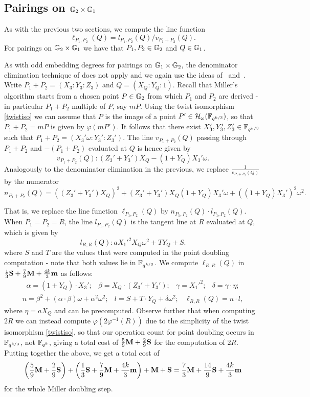 \subsection{Pairings on $\mathbb{G}_{2} \times \mathbb{G}_{1}$}

As with the previous two sections, we compute the line function 
$$\ell_{P_1,P_2}(Q) = l_{P_1,P_2}(Q)/v_{P_1 + P_2}(Q).$$
For pairings on $\mathbb{G}_{2} \times \mathbb{G}_{1}$ we have that $P_1, P_2 \in \mathbb{G}_{2}$ and $Q \in \mathbb{G}_{1}$.

As with odd embedding degrees for pairings on $\mathbb{G}_{1} \times \mathbb{G}_{2}$, 
the denominator elimination technique of \cite{2010/Gu} does not apply
 and we again use the ideas of~\cite{2008/lin} and~\cite{2009/deg15}.
Write $P_1 + P_2 = (X_3:Y_3:Z_3)$ and $Q = (X_Q:Y_Q:1)$. 
Recall that Miller's algorithm starts from a chosen point $P \in \mathbb{G}_{2}$
from which $P_1$ and $P_2$ are derived - in particular $P_1 + P_2$
multiple of $P$, say $mP$.
Using the twist isomorphism \eqref{twistiso} we can assume that
$P$ is the image of a point $P' \in \mathcal{H}_{\omega}(\mathbb{F}_{q^{k/3}})$,
so that $P_1 + P_2 = mP$ is given by $\varphi(mP')$.
It follows that there exist $X_3', Y_3',Z_3' \in \mathbb{F}_{q^{k/3}}$ such that
$P_1 + P_2 = (X_3'\omega : Y_3':Z_3')$. 
The line $v_{P_1+P_2}(Q)$ passing through $P_1+P_2$ and $-(P_1 + P_2)$ 
evaluated at $Q$
is hence given by
\[v_{P_1+P_2}(Q): 
(Z_3' + Y_3')X_Q - (1+Y_Q)X_3'\omega.\]
Analogously to the denominator elimination in the previous, we
replace $\frac{1}{v_{P_1+P_2}(Q)}$ by the numerator 
$$n_{P_1+P_2}(Q) = ((Z_3' + Y_3')X_Q)^2 
+ (Z_3' + Y_3')X_Q(1+Y_Q)X_3'\omega 
+ ((1+Y_Q)X_3')^2\omega^2.$$

That is, we replace the line function $\ell_{P_1,P_2}(Q)$ by $n_{P_1,P_2}(Q) \cdot l_{P_1,P_2}(Q)$.
When $P_1 = P_2 = R$, the line $l_{P_1,P_2}(Q)$ is the tangent line at $R$ evaluated at $Q$, which is given by
\[l_{R,R}(Q): aX_1'^2 X_Q \omega^2 + T Y_Q + S.\]
where $S$ and $T$ are the values that were computed in the point doubling computation - note that
both values lie in $\mathbb{F}_{q^{k/3}}$.
We compute $\ell_{R,R}(Q)$ in 
$\frac{1}{3}\textbf{S} + \frac{7}{9}\textbf{M} + \frac{4k}{3}\textbf{m} $ as follows:
\[\begin{array}{cccc}
\alpha = (1+Y_Q)\cdot X_3';&
 \beta = X_Q\cdot (Z_3' + Y_3'); &
 \gamma = X_1'^2; &
 \delta = \gamma\cdot\eta;
\end{array}\]
\[\begin{array}{ccc}
n = \beta^2 + (\alpha \cdot \beta) \omega + \alpha^2 \omega^2; &
l = S + T\cdot Y_Q + \delta\omega^2; &
\ell_{R,R}(Q) = n\cdot l,
\end{array}\]
where $\eta = aX_Q$ and can be precomputed.
Observe further that when computing $2R$ we can instead compute
$\varphi(2\varphi^{-1}(R))$ due to the simplicity of the twist isomorphism \eqref{twistiso},
so that our operation count for point doubling occurs in $\mathbb{F}_{q^{k/3}}$, not $\mathbb{F}_{q^k}$, giving a total cost of $\frac{5}{9}\textbf{M} + \frac{2}{9}\textbf{S}$ for the computation of $2R$.
Putting together the above, we get a total cost of 
\[\left(\frac{5}{9}\textbf{M} + \frac{2}{9}\textbf{S}\right) + \left(\frac{1}{3}\textbf{S} + \frac{7}{9}\textbf{M} + \frac{4k}{3}\textbf{m} \right) + \textbf{M} + \textbf{S} = \frac{7}{3}\textbf{M} + \frac{14}{9}\textbf{S} + \frac{4k}{3}\textbf{m}\]
for the whole Miller doubling step.

